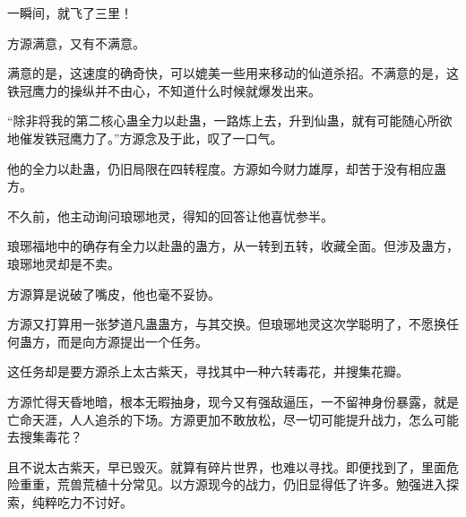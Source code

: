 \begin{this_body}
一瞬间，就飞了三里！

方源满意，又有不满意。

满意的是，这速度的确奇快，可以媲美一些用来移动的仙道杀招。不满意的是，这铁冠鹰力的操纵并不由心，不知道什么时候就爆发出来。

“除非将我的第二核心蛊全力以赴蛊，一路炼上去，升到仙蛊，就有可能随心所欲地催发铁冠鹰力了。”方源念及于此，叹了一口气。

他的全力以赴蛊，仍旧局限在四转程度。方源如今财力雄厚，却苦于没有相应蛊方。

不久前，他主动询问琅琊地灵，得知的回答让他喜忧参半。

琅琊福地中的确存有全力以赴蛊的蛊方，从一转到五转，收藏全面。但涉及蛊方，琅琊地灵却是不卖。

方源算是说破了嘴皮，他也毫不妥协。

方源又打算用一张梦道凡蛊蛊方，与其交换。但琅琊地灵这次学聪明了，不愿换任何蛊方，而是向方源提出一个任务。

这任务却是要方源杀上太古紫天，寻找其中一种六转毒花，并搜集花瓣。

方源忙得天昏地暗，根本无暇抽身，现今又有强敌逼压，一不留神身份暴露，就是亡命天涯，人人追杀的下场。方源更加不敢放松，尽一切可能提升战力，怎么可能去搜集毒花？

且不说太古紫天，早已毁灭。就算有碎片世界，也难以寻找。即便找到了，里面危险重重，荒兽荒植十分常见。以方源现今的战力，仍旧显得低了许多。勉强进入探索，纯粹吃力不讨好。

\end{this_body}

